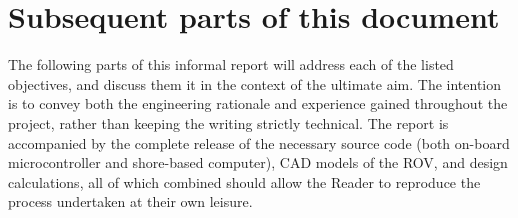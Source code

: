 \section{Subsequent parts of this document}

The following parts of this informal report will address each of the listed objectives,
and discuss them it in the context of the ultimate aim.
The intention is to convey both the engineering rationale and experience gained throughout the project,
rather than keeping the writing strictly technical. The report is accompanied by
the complete release of the necessary source code (both on-board microcontroller and shore-based computer),
CAD models of the ROV, and design calculations, all of which combined should allow
 the Reader to reproduce the process undertaken at their own leisure.
